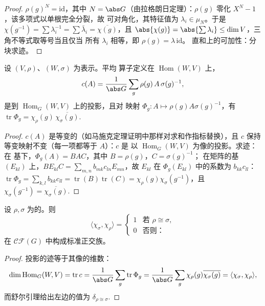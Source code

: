\begin{proof}
$\rho(g)^N = \mathrm{id}$，其中 $N = \abs G$（由拉格朗日定理）：$\rho(g)$
零化 $X^N - 1$，该多项式以单根完全分裂，故
可对角化，其特征值为 $\lambda_i \in \mu_N$。于是
$\chi(g^{-1}) = \sum \lambda_i^{-1} = \sum\bar\lambda_i =
\overline{\chi(g)}$，且 $\abs{\chi(g)} = \abs{\sum\lambda_i}
\leq \dim V$，三角不等式取等号当且仅当
所有 $\lambda_i$ 相等，即 $\rho(g) = \lambda\,\mathrm{id}$。
直和上的可加性：分块求迹。
\end{proof}

\begin{lemma}\label{lem:b3:representations:homtrace}
设 $(V, \rho)$、$(W, \sigma)$ 为表示。平均
算子定义在 $\operatorname{Hom}(W, V)$ 上，
\[
c(A) = \frac1{\abs G}\sum_{g}\rho(g)\,A\,\sigma(g)^{-1},
\]
是到 $\operatorname{Hom}_G(W, V)$ 上的投影，且对
映射 $\Phi_g \colon A \mapsto \rho(g)A\sigma(g)^{-1}$，有
$\operatorname{tr}\Phi_g =
\chi_\rho(g)\,\overline{\chi_\sigma(g)}$.
\end{lemma}

\begin{proof}
$c(A)$ 是等变的（如马施克定理证明中那样对求和作指标替换），且 $c$
保持等变映射不变（每一项都等于 $A$）：$c$ 是
以 $\operatorname{Hom}_G(W, V)$ 为像的投影。求迹：在
基下，$\Phi_g(A) = BAC$，其中 $B = \rho(g)$，$C = \sigma(g)^{-1}$；
在矩阵的基 $(E_{kl})$ 上，$BE_{kl}C = \sum_{m,n}
b_{mk}c_{ln}E_{mn}$，故 $E_{kl}$ 在
$\Phi_g(E_{kl})$ 中的系数为 $b_{kk}c_{ll}$：$\operatorname{tr}\Phi_g =
\sum_{k,l}b_{kk}c_{ll} = \operatorname{tr}(B)
\operatorname{tr}(C) = \chi_\rho(g)\chi_\sigma(g^{-1})$，且
$\chi_\sigma(g^{-1}) = \overline{\chi_\sigma(g)}$.
\end{proof}

\begin{theorem}[第一正交关系]
\label{thm:b3:representations:orthogonality}
设 $\rho, \sigma$ 为\emph{}的。则
\[
\langle\chi_\sigma, \chi_\rho\rangle =
\begin{cases}
1 & \text{若 } \rho \cong \sigma,\\
0 & \text{否则：}
\end{cases}
\]
在
$\mathcal{CF}(G)$ 中构成标准正交族。
\end{theorem}

\begin{proof}
投影的迹等于其像的维数：
\[
\dim\operatorname{Hom}_G(W, V) = \operatorname{tr} c
= \frac1{\abs G}\sum_g \operatorname{tr}\Phi_g
= \frac1{\abs G}\sum_g \chi_\rho(g)\overline{\chi_\sigma(g)}
= \langle \chi_\sigma, \chi_\rho\rangle,
\]
而舒尔引理给出左边的值为 $\delta_{\rho \cong
\sigma}$.
\end{proof}

